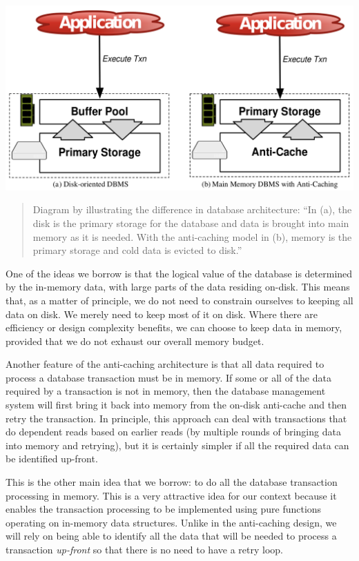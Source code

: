 \documentclass[11pt,a4paper]{article}
\begin{document}
\begin{center}
\includegraphics[scale=0.25]{img/hstore-anticaching-fig1.png}
\begin{quote}
Diagram by \citet[Figure 1]{anti-caching} illustrating the difference in
database architecture: ``In (a), the disk is the primary storage for the
database and data is brought into main memory as it is needed. With the
anti-caching model in (b), memory is the primary storage and cold data is
evicted to disk.''
\end{quote}
\end{center}

One of the ideas we borrow is that the logical value of the database is
determined by the in-memory data, with large parts of the data residing on-disk.
This means that, as a matter of principle, we do not need to constrain ourselves
to keeping all data on disk. We merely need to keep most of it on disk. Where
there are efficiency or design complexity benefits, we can choose to keep data
in memory, provided that we do not exhaust our overall memory budget.

Another feature of the anti-caching architecture is that all data required to
process a database transaction must be in memory. If some or all of the data
required by a transaction is not in memory, then the database management system
will first bring it back into memory from the on-disk anti-cache and then retry
the transaction. In principle, this approach can deal with transactions that do
dependent reads based on earlier reads (by multiple rounds of bringing data into
memory and retrying), but it is certainly simpler if all the required data can
be identified up-front.

This is the other main idea that we borrow: to do all the database transaction
processing in memory. This is a very attractive idea for our context because it
enables the transaction processing to be implemented using pure functions
operating on in-memory data structures. Unlike in the anti-caching design, we
will rely on being able to identify all the data that will be
needed to process a transaction \emph{up-front} so that there is no need to have a retry loop.
\end{document}

